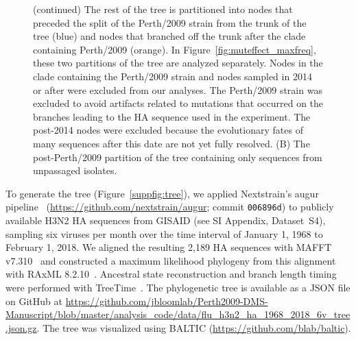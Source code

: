 \begin{figure}\ContinuedFloat
  \caption{(continued)
    The rest of the tree is partitioned into nodes that preceded the split of the Perth/2009 strain from the trunk of the tree (blue) and nodes that branched off the trunk after the clade containing Perth/2009 (orange).
    In Figure~\ref{fig:muteffect_maxfreq}, these two partitions of the tree are analyzed separately.
    Nodes in the clade containing the Perth/2009 strain and nodes sampled in 2014 or after were excluded from our analyses.
    The Perth/2009 strain was excluded to avoid artifacts related to mutations that occurred on the branches leading to the HA sequence used in the experiment.
    The post-2014 nodes were excluded because the evolutionary fates of many sequences after this date are not yet fully resolved.
    (B) The post-Perth/2009 partition of the tree containing only sequences from unpassaged isolates.
  }
\end{figure}

To generate the tree (Figure~\ref{suppfig:tree}), we applied Nextstrain's augur pipeline~\citep{Hadfield2018} (\url{https://github.com/nextstrain/augur}; commit \texttt{006896d}) to publicly available H3N2 HA sequences from GISAID \citep{shu2017gisaid} (see \citet{Lee2018} SI Appendix, Dataset~S4), sampling six viruses per month over the time interval of January 1, 1968 to February 1, 2018.
We aligned the resulting 2,189 HA sequences with MAFFT v7.310~\citep{katoh2013mafft} and constructed a maximum likelihood phylogeny from this alignment with RAxML 8.2.10~\citep{stamatakis2006raxml}.
Ancestral state reconstruction and branch length timing were performed with TreeTime~\citep{Sagulenko2018}.
The phylogenetic tree is available as a JSON file on GitHub at \url{https://github.com/jbloomlab/Perth2009-DMS-Manuscript/blob/master/analysis_code/data/flu_h3n2_ha_1968_2018_6v_tree.json.gz}.
The tree was visualized using BALTIC (\url{https://github.com/blab/baltic}).

\newcommand{\dx}{\mathrm{d}x}						%
\newcommand{\dy}{\mathrm{d}y}						%
\newcommand{\dt}{\mathrm{d}t}						%
\newcommand{\inertia}{\epsilon}			    %
\newcommand{\normal}{\mathcal{N}}				%

